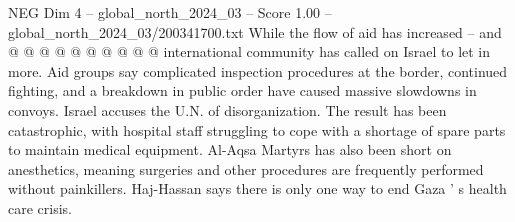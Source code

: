 \begin{textsample}{NEG Dim 4 – global\_north\_2024\_03 – Score 1.00 – global\_north\_2024\_03/200341700.txt}
While the flow of aid has increased -- and @ @ @ @ @ @ @ @ @ @ international community has called on Israel to let in more.
Aid groups say complicated inspection procedures at the border, continued fighting, and a breakdown in public order have caused massive slowdowns in convoys.
Israel accuses the U.N. of disorganization.
The result has been catastrophic, with hospital staff struggling to cope with a shortage of spare parts to maintain medical equipment.
Al-Aqsa Martyrs has also been short on anesthetics, meaning surgeries and other procedures are frequently performed without painkillers.
Haj-Hassan says there is only one way to end Gaza ' s health care crisis.

\end{textsample}
